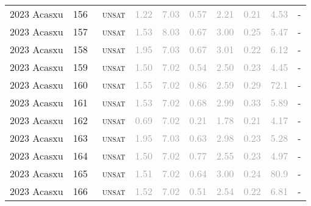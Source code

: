 \begin{center}
{\begin{longtable}{@{}llllllllll@{}}
2023 Acasxu & 156 & ~\textsc{unsat} & \textcolor{darkgray}{1.22} & \textcolor{darkgray}{7.03} & \textcolor{darkgray}{0.57} & \textcolor{darkgray}{2.21} & \textcolor{darkgray}{0.21} & \textcolor{darkgray}{4.53} & - \\
2023 Acasxu & 157 & ~\textsc{unsat} & \textcolor{darkgray}{1.53} & \textcolor{darkgray}{8.03} & \textcolor{darkgray}{0.67} & \textcolor{darkgray}{3.00} & \textcolor{darkgray}{0.25} & \textcolor{darkgray}{5.47} & - \\
2023 Acasxu & 158 & ~\textsc{unsat} & \textcolor{darkgray}{1.95} & \textcolor{darkgray}{7.03} & \textcolor{darkgray}{0.67} & \textcolor{darkgray}{3.01} & \textcolor{darkgray}{0.22} & \textcolor{darkgray}{6.12} & - \\
2023 Acasxu & 159 & ~\textsc{unsat} & \textcolor{darkgray}{1.50} & \textcolor{darkgray}{7.02} & \textcolor{darkgray}{0.54} & \textcolor{darkgray}{2.50} & \textcolor{darkgray}{0.23} & \textcolor{darkgray}{4.45} & - \\
2023 Acasxu & 160 & ~\textsc{unsat} & \textcolor{darkgray}{1.55} & \textcolor{darkgray}{7.02} & \textcolor{darkgray}{0.86} & \textcolor{darkgray}{2.59} & \textcolor{darkgray}{0.29} & \textcolor{darkgray}{72.1} & - \\
2023 Acasxu & 161 & ~\textsc{unsat} & \textcolor{darkgray}{1.53} & \textcolor{darkgray}{7.02} & \textcolor{darkgray}{0.68} & \textcolor{darkgray}{2.99} & \textcolor{darkgray}{0.33} & \textcolor{darkgray}{5.89} & - \\
2023 Acasxu & 162 & ~\textsc{unsat} & \textcolor{darkgray}{0.69} & \textcolor{darkgray}{7.02} & \textcolor{darkgray}{0.21} & \textcolor{darkgray}{1.78} & \textcolor{darkgray}{0.21} & \textcolor{darkgray}{4.17} & - \\
2023 Acasxu & 163 & ~\textsc{unsat} & \textcolor{darkgray}{1.95} & \textcolor{darkgray}{7.03} & \textcolor{darkgray}{0.63} & \textcolor{darkgray}{2.98} & \textcolor{darkgray}{0.23} & \textcolor{darkgray}{5.28} & - \\
2023 Acasxu & 164 & ~\textsc{unsat} & \textcolor{darkgray}{1.50} & \textcolor{darkgray}{7.02} & \textcolor{darkgray}{0.77} & \textcolor{darkgray}{2.55} & \textcolor{darkgray}{0.23} & \textcolor{darkgray}{4.97} & - \\
2023 Acasxu & 165 & ~\textsc{unsat} & \textcolor{darkgray}{1.51} & \textcolor{darkgray}{7.02} & \textcolor{darkgray}{0.64} & \textcolor{darkgray}{3.00} & \textcolor{darkgray}{0.24} & \textcolor{darkgray}{80.9} & - \\
2023 Acasxu & 166 & ~\textsc{unsat} & \textcolor{darkgray}{1.52} & \textcolor{darkgray}{7.02} & \textcolor{darkgray}{0.51} & \textcolor{darkgray}{2.54} & \textcolor{darkgray}{0.22} & \textcolor{darkgray}{6.81} & - \\

\end{longtable}}
\end{center}
